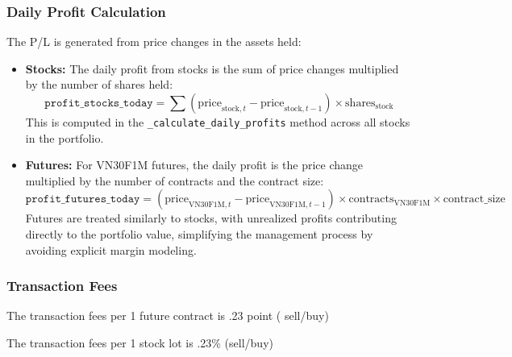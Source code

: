 \documentclass[a4paper,12pt]{article}
\begin{document}
\subsubsection{Daily Profit Calculation}
The P/L is generated from price changes in the assets held:
\begin{itemize}
    \item \textbf{Stocks:} The daily profit from stocks is the sum of price changes multiplied by the number of shares held:
    \begin{equation}
    \texttt{profit\_stocks\_today} = \sum (\text{price}_{\text{stock},t} - \text{price}_{\text{stock},t-1}) \times \text{shares}_{\text{stock}}
    \end{equation}
    This is computed in the \texttt{\_calculate\_daily\_profits} method across all stocks in the portfolio.
    \item \textbf{Futures:} For VN30F1M futures, the daily profit is the price change multiplied by the number of contracts and the contract size:
    \begin{equation}
    \texttt{profit\_futures\_today} = (\text{price}_{\text{VN30F1M},t} - \text{price}_{\text{VN30F1M},t-1}) \times \text{contracts}_{\text{VN30F1M}} \times \text{contract\_size}
    \end{equation}
    Futures are treated similarly to stocks, with unrealized profits contributing directly to the portfolio value, simplifying the management process by avoiding explicit margin modeling.
\end{itemize}


\subsubsection{Transaction Fees}
The transaction fees per 1 future contract is .23 point ( sell/buy)

The transaction fees per 1 stock lot is .23\% (sell/buy)
\end{document}
